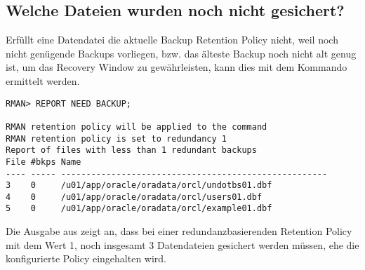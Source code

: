       \subsection{Welche Dateien wurden noch nicht gesichert?}
        Erf\"ullt eine Datendatei die aktuelle Backup Retention Policy nicht, weil noch nicht gen\"ugende Backups vorliegen, bzw. das \"alteste Backup noch nicht alt genug ist, um das Recovery Window zu gew\"ahrleisten, kann dies mit dem Kommando  ermittelt werden.
        \begin{lstlisting}[caption={Wer verst\"o\ss{}t gegen die Retention Policy?},label=admin1353,language=rman]
RMAN> REPORT NEED BACKUP;

RMAN retention policy will be applied to the command
RMAN retention policy is set to redundancy 1
Report of files with less than 1 redundant backups
File #bkps Name
---- ----- -----------------------------------------------------
3    0     /u01/app/oracle/oradata/orcl/undotbs01.dbf
4    0     /u01/app/oracle/oradata/orcl/users01.dbf
5    0     /u01/app/oracle/oradata/orcl/example01.dbf
        \end{lstlisting}
        Die Ausgabe aus  zeigt an, dass bei einer redundanzbasierenden Retention Policy mit dem Wert 1, noch insgesamt 3 Datendateien gesichert werden m\"ussen, ehe die konfigurierte Policy eingehalten wird.

